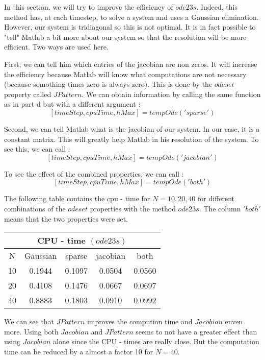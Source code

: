 In this section, we will try to improve the efficiency of $ode23s$. Indeed, this method has, at each timestep, to solve a system and uses a Gaussian elimination. However, our system is tridiagonal so this is not optimal. It is in fact possible to "tell" Matlab a bit more about our system so that the resolution will be more efficient. Two ways are used here. 

First, we can tell him which entries of the jacobian are non zeros. It will increase the efficiency because Matlab will know what computations are not necessary (because somothing times zero is always zero). This is done by the $odeset$ property called $JPattern$. We can obtain information by calling the same function as in part d but with a different argument : 
$$[timeStep,cpuTime,hMax] = tempOde('sparse')$$

Second, we can tell Matlab what is the jacobian of our system. In our case, it is a constant matrix. This will greatly help Matlab in his resolution of the system. To see this, we can call : 
$$[timeStep,cpuTime,hMax] = tempOde('jacobian')$$

To see the effect of the combined properties, we can call : 
$$[timeStep,cpuTime,hMax] = tempOde('both')$$

The following table contains the cpu - time for $N=10,20,40$ for different combinations of the $odeset$ properties with the method $ode23s$. The column $'both'$ means that the two properties were set.

\begin{center}
\begin{tabular}{|c|c|c|c|c|}
\multicolumn{5}{c}{\textbf{CPU - time} $(ode23s)$} \\
\hline 
 N& Gaussian & sparse & jacobian & both \\ 
\hline 
10 & 0.1944 & 0.1097 & 0.0504 & 0.0560 \\ 
\hline 
20 & 0.4108 & 0.1476 & 0.0667 & 0.0697 \\ 
\hline 
40 & 0.8883 & 0.1803 & 0.0910 & 0.0992 \\ 
\hline 
\end{tabular} 
\end{center}

We can see that $JPattern$ improves the compution time and $Jacobian$ enven more. Using both $Jacobian$ and $JPattern$ seems to not have a greater effect than using $Jacobian$ alone since the CPU - times are really close. But the computation time can be reduced by a almost a factor 10 for $N=40$.

